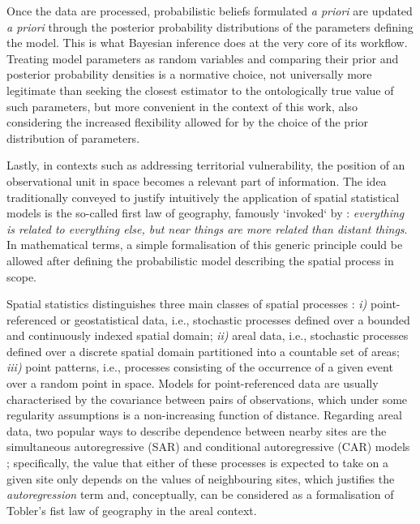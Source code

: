 \documentclass[openany, 11pt, oneside]{book}
\begin{document}
Once the data are processed, probabilistic beliefs formulated \textit{a priori} are updated \textit{a priori} through the posterior probability distributions of the parameters defining the model. This is what Bayesian inference does at the very core of its workflow. Treating model parameters as random variables and comparing their prior and posterior probability densities is a normative choice, not universally more legitimate than seeking the closest estimator to the ontologically true value of such parameters, but more convenient in the context of this work, also considering the increased flexibility allowed for by the choice of the prior distribution of parameters.

Lastly, in contexts such as addressing territorial vulnerability, the position of an observational unit in space becomes a relevant part of information. The idea traditionally conveyed to justify intuitively the application of spatial statistical models is the so-called first law of geography, famously `invoked` by \cite{Tobler1970}: \textit{everything is related to everything else, but near things are more related than distant things}. In mathematical terms, a simple formalisation of this generic principle could be allowed after defining the probabilistic model describing the spatial process in scope.

Spatial statistics distinguishes three main classes of spatial processes \parencite[see e.g.][]{Cressie1993, Banerjee}: \emph{i)} point-referenced or geostatistical data, i.e., stochastic processes defined over a bounded and continuously indexed spatial domain; \emph{ii)} areal data, i.e., stochastic processes defined over a discrete spatial domain partitioned into a countable set of areas; \emph{iii)} point patterns, i.e., processes consisting of the occurrence of a given event over a random point in space. Models for point-referenced data are usually characterised by the covariance between pairs of observations, which under some regularity assumptions is a non-increasing function of distance. Regarding areal data, two popular ways to describe dependence between nearby sites are the simultaneous autoregressive (SAR) and conditional autoregressive (CAR) models \parencite[see e.g.][]{ICAR, Cressie1993}; specifically, the value that either of these processes is expected to take on a given site only depends on the values of neighbouring sites, which justifies the \textit{autoregression} term and, conceptually, can be considered as a formalisation of Tobler's fist law of geography in the areal context. 
\end{document}
